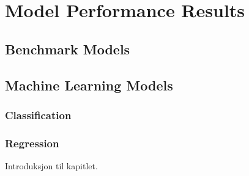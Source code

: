 \documentclass[../../main.tex]{subfiles}
\begin{document}

\section{Model Performance Results}

\subsection{Benchmark Models}
\subsection{Machine Learning Models}
\subsubsection{Classification}
\subsubsection{Regression}

Introduksjon til kapitlet.

\end{document}
